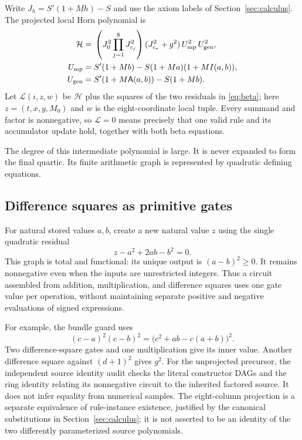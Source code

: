 \documentclass[10pt,letterpaper]{article}
\theoremstyle{definition}\newtheorem{definition}[theorem]{Definition}
\theoremstyle{remark}\newtheorem{remark}[theorem]{Remark}
\begin{document}
Write $J_h=S'(1+Mh)-S$ and use the axiom labels of
Section~\ref{sec:calculus}. The projected local Horn polynomial is
\begin{align}
 \mathcal H={}&
 \left(J_0^2\prod_{j=1}^8J_{c_j}^2\right)
 (J_{c_*}^2+g^2)\,U_{\rm mp}^2\,U_{\rm gen}^2,\label{eq:horn}\\
 U_{\rm mp}={}&S'(1+Mb)-S(1+Ma)(1+MI(a,b)),\nonumber\\
 U_{\rm gen}={}&S'(1+M\mathsf A(a,b))-S(1+Mb).\nonumber
\end{align}
Let $\mathcal L(i,z,w)$ be $\mathcal H$ plus the squares of the two
residuals in \eqref{eq:beta}; here $z=(t,x,y,M_0)$ and $w$ is the
eight-coordinate local tuple. Every summand and factor is nonnegative,
so $\mathcal L=0$ means precisely that one valid rule and its accumulator
update hold, together with both beta equations.

The degree of this intermediate polynomial is large. It is never expanded
to form the final quartic. Its finite arithmetic graph is represented by
quadratic defining equations.

\subsection{Difference squares as primitive gates}

For natural stored values $a,b$, create a new natural value $z$ using the
single quadratic residual
\begin{equation}\label{eq:squaregate}
 z-a^2+2ab-b^2=0.
\end{equation}
This graph is total and functional: its unique output is $(a-b)^2\ge0$.
It remains nonnegative even when the inputs are unrestricted integers.
Thus a circuit assembled from addition, multiplication, and difference
squares uses one gate value per operation, without maintaining separate
positive and negative evaluations of signed expressions.

For example, the bundle guard uses
\[
 (c-a)^2(c-b)^2
   =\bigl(c^2+ab-c(a+b)\bigr)^2.
\]
Two difference-square gates and one multiplication give its inner value.
Another difference square against $(d+1)^2$ gives $g^2$.
For the unprojected precursor, the independent source identity audit
checks the literal constructor DAGs and the ring identity relating its
nonnegative circuit to the inherited factored source. It does not infer
equality from numerical samples. The eight-column projection is a separate
equivalence of rule-instance existence, justified by the canonical
substitutions in Section~\ref{sec:calculus}; it is not asserted to be an
identity of the two differently parameterized source polynomials.
\end{document}
